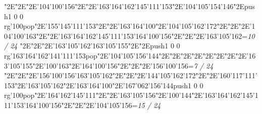\null\vfill\enskip\enskip\enskip\ipa\char"2E\enskip\enskip\enskip\ipa\char"2E\enskip\ipa\char"2E\enskip\enskip\enskip\bigskip\ipa\char'104\ipa\char'100\ipa\char'156\ipa\char"2E\enskip\enskip\enskip\ipa\char"2E\ipa\char'163\ipa\char'164\ipa\char'162\ipa\char'145\ipa\char'111\ipa\char'153\bigskip\enskip\enskip\ipa\char"2E\ipa\char'104\ipa\char'105\ipa\char'154\ipa\char'146\ipa\char"2E\pdfcolorstack\match push{1 0 0 rg}\ipa\char'100\pdfcolorstack\match pop{}\ipa\char"2E\ipa\char'155\ipa\char'145\ipa\char'111\ipa\char'153\ipa\char"2E\enskip\enskip\enskip\ipa\char"2E\ipa\char'163\ipa\char'164\ipa\char'100\ipa\char"2E\ipa\char'104\ipa\char'105\ipa\char'162\ipa\char'172\bigskip\enskip\ipa\char"2E\enskip\enskip\enskip\enskip\ipa\char"2E\enskip\enskip\ipa\char"2E\ipa\char'104\ipa\char'100\ipa\char'163\ipa\char"2E\enskip\enskip\ipa\char"2E\ipa\char'163\ipa\char'164\ipa\char'162\ipa\char'145\ipa\char'111\ipa\char'153\bigskip\ipa\char'164\ipa\char'100\ipa\char'156\ipa\char"2E\enskip\enskip\ipa\char"2E\enskip\enskip\enskip\ipa\char"2E\ipa\char'163\ipa\char'105\ipa\char'162\bigskip\vfill\footline={\hfill\tenrm\it 10 / 24}\eject
\null\vfill\enskip\enskip\enskip\ipa\char"2E\enskip\enskip\enskip\ipa\char"2E\enskip\ipa\char"2E\ipa\char'163\ipa\char'105\ipa\char'162\bigskip\ipa\char'163\ipa\char'105\ipa\char'155\ipa\char"2E\enskip\enskip\enskip\ipa\char"2E\pdfcolorstack\match push{1 0 0 rg}\ipa\char'163\ipa\char'164\ipa\char'162\ipa\char'141\ipa\char'111\ipa\char'153\pdfcolorstack\match pop{}\bigskip\enskip\enskip\ipa\char"2E\ipa\char'104\ipa\char'105\ipa\char'156\ipa\char'144\ipa\char"2E\enskip\ipa\char"2E\enskip\enskip\enskip\enskip\ipa\char"2E\enskip\enskip\enskip\ipa\char"2E\enskip\enskip\enskip\ipa\char"2E\enskip\enskip\enskip\enskip\bigskip\enskip\ipa\char"2E\enskip\enskip\enskip\enskip\ipa\char"2E\enskip\enskip\ipa\char"2E\ipa\char'163\ipa\char'105\ipa\char'155\ipa\char"2E\ipa\char'100\ipa\char'163\ipa\char"2E\enskip\enskip\enskip\enskip\enskip\enskip\bigskip\ipa\char'164\ipa\char'100\ipa\char'156\ipa\char"2E\enskip\enskip\ipa\char"2E\enskip\enskip\enskip\ipa\char"2E\ipa\char'156\ipa\char'100\ipa\char'156\bigskip\vfill\footline={\hfill\tenrm\it 7 / 24}\eject
\null\vfill\enskip\enskip\enskip\ipa\char"2E\enskip\enskip\enskip\ipa\char"2E\enskip\ipa\char"2E\ipa\char'156\ipa\char'100\ipa\char'156\bigskip\ipa\char'163\ipa\char'105\ipa\char'162\ipa\char"2E\enskip\enskip\enskip\ipa\char"2E\enskip\enskip\enskip\enskip\enskip\enskip\bigskip\enskip\enskip\ipa\char"2E\ipa\char'144\ipa\char'105\ipa\char'162\ipa\char'172\ipa\char"2E\enskip\ipa\char"2E\ipa\char'160\ipa\char'117\ipa\char'111\ipa\char'153\ipa\char"2E\ipa\char'163\ipa\char'105\ipa\char'162\ipa\char"2E\ipa\char'163\ipa\char'164\ipa\char'100\ipa\char"2E\ipa\char'167\ipa\char'062\ipa\char'156\ipa\char'144\bigskip\pdfcolorstack\match push{1 0 0 rg}\ipa\char'100\pdfcolorstack\match pop{}\ipa\char"2E\ipa\char'164\ipa\char'162\ipa\char'145\ipa\char'111\ipa\char"2E\enskip\enskip\ipa\char"2E\ipa\char'163\ipa\char'105\ipa\char'156\ipa\char"2E\ipa\char'100\ipa\char'144\ipa\char"2E\ipa\char'163\ipa\char'164\ipa\char'162\ipa\char'145\ipa\char'111\ipa\char'153\bigskip\ipa\char'164\ipa\char'100\ipa\char'156\ipa\char"2E\enskip\enskip\ipa\char"2E\enskip\enskip\enskip\ipa\char"2E\ipa\char'104\ipa\char'105\ipa\char'156\bigskip\vfill\footline={\hfill\tenrm\it 15 / 24}\eject
